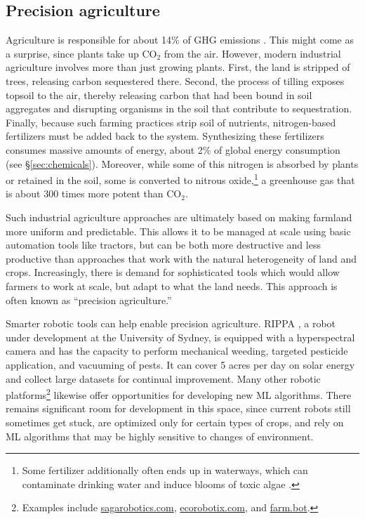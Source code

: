 \documentclass[11pt]{report}
\newcommand{\Gap}{\texorpdfstring{\hfill}{}}
\newcommand{\Rec}{\texorpdfstring{{\small\emph{\color{blue}{\fbox{High Leverage}}}}}{}}
\newcommand{\HighRisk}{\texorpdfstring{{\small\emph{\color{orange}{\fbox{Uncertain Impact}}}}}{}}
\newcommand{\cd}{CO$_2$\xspace}
\begin{document}
\subsection{Precision agriculture\Gap \Rec
\HighRisk}\label{sec:agriculture}
Agriculture is responsible for about 14\% of GHG emissions \cite{ipcc2014summary}. This might come as a surprise, since plants take up \cd from the air. However, modern industrial agriculture involves more than just growing plants. First, the land is stripped of trees, releasing carbon sequestered there. Second, the process of tilling exposes topsoil to the air, thereby releasing carbon that had been bound in soil aggregates and disrupting organisms in the soil that contribute to sequestration. Finally, because such farming practices strip soil of nutrients, nitrogen-based fertilizers must be added back to the system. Synthesizing these fertilizers consumes massive amounts of energy, about 2\% of global energy consumption \cite{montoya2015challenge} (see \S\ref{sec:chemicals}). Moreover, while some of this nitrogen is absorbed by plants or retained in the soil, some is converted to nitrous oxide,\footnote{Some fertilizer additionally often ends up in waterways, which can contaminate drinking water and induce blooms of toxic algae \cite{robertson2009nitrogen}.} a greenhouse gas that is about 300 times more potent than \cd.  

Such industrial agriculture approaches are ultimately based on making farmland more uniform and predictable. This allows it to be managed at scale using basic automation tools like tractors, but can be both more destructive and less productive than approaches that work with the natural heterogeneity of land and crops. Increasingly, there is demand for sophisticated tools which would allow farmers to work at scale, but adapt to what the land needs. This approach is often known as ``precision agriculture.'' 

Smarter robotic tools can help enable precision agriculture. RIPPA \cite{sukkarieh2017mobile}, a robot under development at the University of Sydney, is equipped with a hyperspectral camera and has the capacity to perform mechanical weeding, targeted pesticide application, and vacuuming of pests. It can cover 5 acres per day on solar energy and collect large datasets \cite{bender2019ladybird} for continual improvement. Many other robotic platforms\footnote{Examples include \url{sagarobotics.com}, \url{ecorobotix.com}, and \url{farm.bot}.} likewise offer opportunities for developing new ML algorithms. There remains significant room for development in this space, since current robots still sometimes get stuck, are optimized only for certain types of crops, and rely on ML algorithms that may be highly sensitive to changes of environment. 
\end{document}
